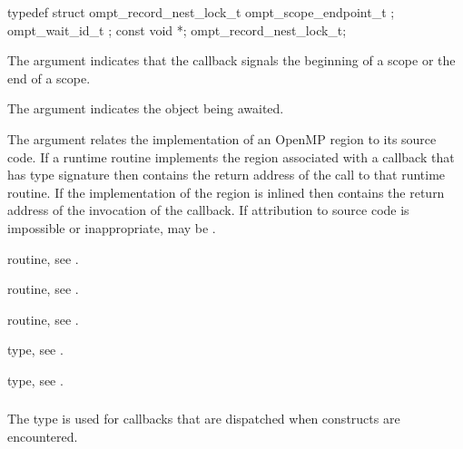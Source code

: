 \record
\begin{ccppspecific}
\begin{omptRecord}
typedef struct ompt_record_nest_lock_t {
  ompt_scope_endpoint_t ;
  ompt_wait_id_t ;
  const void *;
} ompt_record_nest_lock_t;
\end{omptRecord}
\end{ccppspecific}

\argdesc
The  argument indicates that the callback signals
the beginning of a scope or the end of a scope.

The  argument indicates the object being awaited.

The  argument relates the implementation of an OpenMP region
to its source code. If a runtime routine implements the region associated with
a callback that has type signature  then
 contains the return address of the call to that runtime routine.
If the implementation of the region is inlined then  contains the
return address of the invocation of the callback. If attribution to source code
is impossible or inappropriate,  may be .

\begin{crossrefs}
\item {} routine, 
see .

\item {} routine, 
see .

\item {} routine, 
see .

\item {} type, see 
.

\item {} type, see .
\end{crossrefs}



\subsubsection{}
\label{sec:ompt_callback_flush_t}
\summary
The  type is used for callbacks that are
dispatched when  constructs are encountered.

